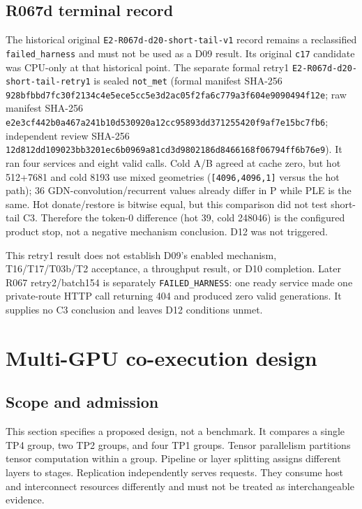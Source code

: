 \documentclass[11pt]{article}
\begin{document}
\subsection{R067d terminal record}
\label{sec:r067d}

The historical original \texttt{E2-R067d-d20-short-tail-v1} record remains a reclassified \texttt{failed\_harness} and must not be used as a D09 result. Its original \texttt{c17} candidate was CPU-only at that historical point. The separate formal retry1 \texttt{E2-R067d-d20-short-tail-retry1} is sealed \texttt{not\_met} (formal manifest SHA-256 \texttt{928bfbbd7fc30f2134c4e5ece5cc5e3d2ac05f2fa6c779a3f604e9090494f12e}; raw manifest SHA-256 \texttt{e2e3cf442b0a467a241b10d530920a12cc95893dd371255420f9af7e15bc7fb6}; independent review SHA-256 \texttt{12d812dd109023bb3201ec6b0969a81cd3d9802186d8466168f06794ff6b76e9}). It ran four services and eight valid calls. Cold A/B agreed at cache zero, but hot 512+7681 and cold 8193 use mixed geometries (\texttt{[4096,4096,1]} versus the hot path); 36 GDN-convolution/recurrent values already differ in P while PLE is the same. Hot donate/restore is bitwise equal, but this comparison did not test short-tail C3. Therefore the token-0 difference (hot 39, cold 248046) is the configured product stop, not a negative mechanism conclusion. D12 was not triggered.

This retry1 result does not establish D09's enabled mechanism, T16/T17/T03b/T2 acceptance, a throughput result, or D10 completion. Later R067 retry2/batch154 is separately \texttt{FAILED\_HARNESS}: one ready service made one private-route HTTP call returning 404 and produced zero valid generations. It supplies no C3 conclusion and leaves D12 conditions unmet.

\section{Multi-GPU co-execution design}

\subsection{Scope and admission}

This section specifies a proposed design, not a benchmark. It compares a single TP4 group, two TP2 groups, and four TP1 groups. Tensor parallelism partitions tensor computation within a group. Pipeline or layer splitting assigns different layers to stages. Replication independently serves requests. They consume host and interconnect resources differently and must not be treated as interchangeable evidence.
\end{document}
